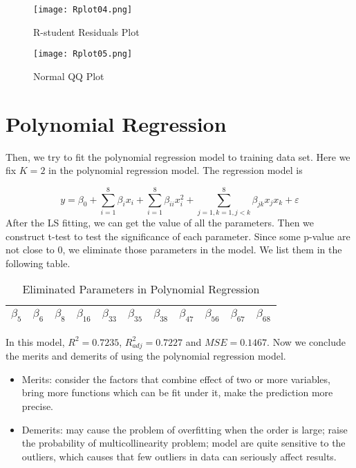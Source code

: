 \documentclass[12pt,a4paper]{article}
\begin{document}
\begin{figure}[h]
	\centering
	\begin{minipage}[t]{0.48\textwidth}
		\centering
		\texttt{[image: Rplot04.png]}
		\caption{R-student Residuals Plot}
	\end{minipage}
	\begin{minipage}[t]{0.48\textwidth}
		\centering
		\texttt{[image: Rplot05.png]}
		\caption{Normal QQ Plot}
	\end{minipage}                      
\end{figure}

\section{Polynomial Regression}
\qquad Then, we try to fit the polynomial regression model to training data set. Here we fix $K=2$ in the polynomial regression model. The regression model is 

\begin{equation}
y = \beta_{0}+\sum_{i=1}^{8}\beta_{i}x_{i}+\sum_{i=1}^{8}\beta_{ii}x_{i}^{2}+\sum_{j=1,k=1,j<k}^{8}\beta_{jk}x_{j}x_{k}+\varepsilon
\end{equation}
\indent After the LS fitting, we can get the value of all the parameters.
Then we construct t-test to test the significance of each parameter. Since some p-value are not close to 0, we eliminate those parameters in the model. We list them in the following table.
\begin{table}[h]
	\centering
	\begin{tabular}{ccccccccccc}
		\hline
		$\beta_{5}$ & $\beta_{6}$ & $\beta_{8}$ & $\beta_{16}$ & $\beta_{33}$ & $\beta_{35}$ & $\beta_{38}$ & $\beta_{47}$ & $\beta_{56}$ & $\beta_{67}$ & $\beta_{68}$ \\
		\hline
	\end{tabular}
	\caption{Eliminated Parameters in Polynomial Regression}
\end{table}

\indent In this model, $R^{2}=0.7235$, $R^{2}_{adj}=0.7227$ and $MSE=0.1467$. Now we conclude the merits and demerits of using the polynomial regression model.

\begin{itemize}
	\item Merits: consider the factors that combine effect of two or more variables, bring more functions which can be fit under it, make the prediction more precise.
	\item Demerits: may cause the problem of overfitting when the order is large; raise the probability of multicollinearity problem; model are quite sensitive to the outliers, which causes that few outliers in data can seriously affect results.
\end{itemize}
\end{document}
